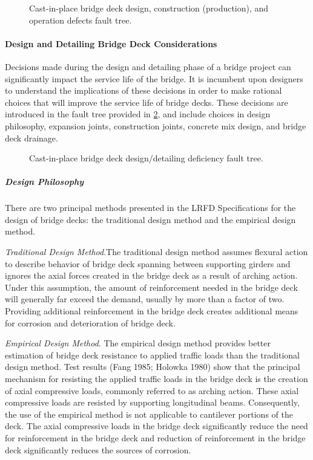 \begin{figure}
  \caption{Cast-in-place bridge deck design, construction (production), and operation defects fault tree.}
  \label{fig:fault-tree-cip-deck-operation}
\end{figure}

\paragraph{Design and Detailing Bridge Deck Considerations}
Decisions made during the design and detailing phase of a bridge project can significantly impact the service life of the bridge. It is incumbent upon designers to understand the implications of these decisions in order to make rational choices that will improve the service life of bridge decks. These decisions are introduced in the fault tree provided in \cref{fig:fault-tree-cip-deck-design}, and include choices in design philosophy, expansion joints, construction joints, concrete mix design, and bridge deck drainage.

\begin{figure}
  \caption{Cast-in-place bridge deck design/detailing deficiency fault tree.}
  \label{fig:fault-tree-cip-deck-design}
\end{figure}

\subparagraph{Design Philosophy}
There are two principal methods presented in the LRFD Specifications for the design of bridge decks: the traditional design method and the empirical design method.

\emph{Traditional Design Method}.The traditional design method assumes flexural action to describe behavior of bridge deck spanning between supporting girders and ignores the axial forces created in the bridge deck as a result of arching action. Under this assumption, the amount of reinforcement needed in the bridge deck will generally far exceed the demand, usually by more than a factor of two. Providing additional reinforcement in the bridge deck creates additional means for corrosion and deterioration of bridge deck.

\emph{Empirical Design Method}. The empirical design method provides better estimation of bridge deck resistance to applied traffic loads than the traditional design method. Test results (Fang 1985; Holowka 1980) show that the principal mechanism for resisting the applied traffic loads in the bridge deck is the creation of axial compressive loads, commonly referred to as arching action. These axial compressive loads are resisted by supporting longitudinal beams. Consequently, the use of the empirical method is not applicable to cantilever portions of the deck. The axial compressive loads in the bridge deck significantly reduce the need for reinforcement in the bridge deck and reduction of reinforcement in the bridge deck significantly reduces the sources of corrosion.

